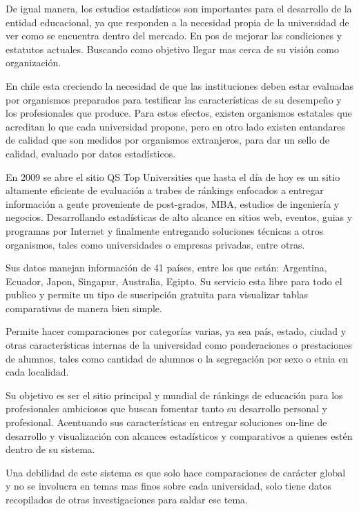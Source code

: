 \documentclass[a4paper,12pt,openany,oneside]{book}
\begin{document}
De igual manera, los estudios estadísticos son importantes para el desarrollo de la entidad educacional, ya que responden a la necesidad propia de la universidad de ver como se encuentra dentro del mercado. En pos de mejorar las condiciones y estatutos actuales. Buscando como objetivo llegar mas cerca de su visión como organización.

En chile esta creciendo la necesidad de que las instituciones deben estar evaluadas por organismos preparados para testificar las características de su desempeño y los profesionales que produce. Para estos efectos, existen organismos estatales que acreditan lo que cada universidad propone, pero en otro lado existen entandares de calidad que son medidos por organismos extranjeros, para dar un sello de calidad, evaluado por datos estadísticos\cite{data1}.

En 2009 se abre el sitio QS Top Universities que hasta el día de hoy es un sitio altamente eficiente de evaluación a trabes de ránkings enfocados a entregar información a gente proveniente de post-grados, MBA, estudios de ingeniería y negocios. Desarrollando estadísticas de alto alcance en sitios web, eventos, guias y programas por Internet y finalmente entregando soluciones técnicas a otros organismos, tales como universidades o empresas privadas, entre otras.

Sus datos manejan información de 41 países, entre los que están: Argentina, Ecuador, Japon, Singapur, Australia, Egipto. Su servicio esta libre para todo el publico y permite un tipo de suscripción gratuita para visualizar tablas comparativas de manera bien simple.

Permite hacer comparaciones por categorías varias, ya sea país, estado, ciudad y otras características internas de la universidad como ponderaciones o prestaciones de alumnos, tales como cantidad de alumnos o la segregación por sexo o etnia en cada localidad.

Su objetivo es ser el sitio principal y mundial de ránkings de educación para los profesionales ambiciosos que buscan fomentar tanto su desarrollo personal y profesional. Acentuando sus características en entregar soluciones on-line de desarrollo y visualización con alcances estadísticos y comparativos a quienes estén dentro de su sistema.

Una debilidad de este sistema es que solo hace comparaciones de carácter global y no se involucra en temas mas finos sobre cada universidad, solo tiene datos recopilados de otras investigaciones para saldar ese tema.
\end{document}
